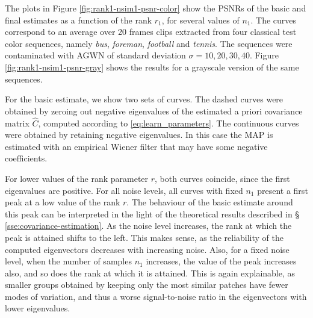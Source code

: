\documentclass[10pt, journal, twocolumn, final, a4paper]{IEEEtran}
\newcommand{\pa}[1]{\textcolor{cyan}{#1}}
\newcommand{\prm}[1]{\pa{\sout{#1}}}
\newcommand{\pcomment}[1]{}
\begin{document}



The plots in Figure \ref{fig:rank1-nsim1-psnr-color} show the PSNRs of the
basic and final estimates as a function of the rank $r_1$, for several values
of $n_{1}$. The curves correspond to an average over 20 frames clips extracted
from four classical test color sequences, namely \emph{bus}, \emph{foreman},
\emph{football} and
\emph{tennis}. The sequences were contaminated with
AGWN of standard deviation $\sigma = 10, 20, 30, 40$. 
Figure \ref{fig:rank1-nsim1-psnr-gray} shows the results for a
grayscale version of the same sequences. 
%
%

{For the basic estimate, we show two sets of curves. The dashed curves were
obtained by zeroing out negative eigenvalues of the estimated a priori covariance
matrix $\widehat C$, computed according to \eqref{eq:learn_parameters}. The continuous curves 
were obtained by retaining negative eigenvalues. In this case the MAP is estimated
with an empirical Wiener filter that may have some negative coefficients.}

{For lower values of the rank parameter $r$, both curves coincide, since the first
eigenvalues are positive. 
For all noise levels, all curves with fixed $n_1$ present a first peak at a low value of the rank $r$.
The behaviour of the basic estimate around this peak can be
interpreted in the light of the theoretical results described in \S
\ref{sse:covariance-estimation}.
As the noise level increases, the rank at which the peak is attained
shifts to the left. This makes sense, as the reliability of the computed eigenvectors
decreases with increasing noise.
%
Also, for a fixed noise level, when the number of samples $n_1$ increases, the value
of the peak increases also, and so does the rank at which it is attained.
This is again explainable, as smaller groups obtained by keeping only the
most similar patches have fewer modes of variation, and thus a worse signal-to-noise ratio
in the eigenvectors with lower eigenvalues.}
\end{document}

